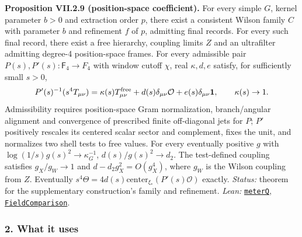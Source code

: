 \documentclass[
  letterpaper,
  11pt]{article}
\begin{document}
\textbf{Proposition VII.2.9 (position-space coefficient).} For every
simple \(G\), kernel parameter \(b>0\) and extraction order \(p\), there
exist a consistent Wilson family \(C\) with parameter \(b\) and
refinement \(f\) of \(p\), admitting final records. For every such final
record, there exist a free hierarchy, coupling limits \(Z\) and an
ultrafilter admitting degree-4 position-space frames. For every
admissible pair \(P(s),P'(s):\mathsf F_4\to F_4\) with window cutoff
\(\chi\), real \(\kappa,d,e\) satisfy, for sufficiently small \(s>0\),
\[P'(s)^{-1}(s^4T_{\mu\nu})=\kappa(s)T^{\rm free}_{\mu\nu}+d(s)\delta_{\mu\nu}\mathcal O+e(s)\delta_{\mu\nu}\mathbf1,\qquad\kappa(s)\to1.\]
Admissibility requires position-space Gram normalization, branch/angular
alignment and convergence of prescribed finite off-diagonal jets for
\(P\); \(P'\) positively rescales its centered scalar sector and
complement, fixes the unit, and normalizes two shell tests to free
values. For every eventually positive \(g\) with
\(\log(1/s)g(s)^2\to\kappa_G^{-1}\), \(d(s)/g(s)^2\to d_2\). The
test-defined coupling satisfies \(g_X/g_W\to1\) and
\(d-d_2g_X^2=O(g_X^4)\), where \(g_W\) is the Wilson coupling from
\(Z\). Eventually
\(s^4\Theta=4d(s)\mathrm{center}_{\xi_*}(P'(s)\mathcal O)\) exactly.
\emph{Status:} theorem for the supplementary construction's family and
refinement. \emph{Lean:}
\href{https://github.com/yang-mills-group/OpenAI-YM-20261028/blob/3456e5e75cf8d4cd558955a5c7638fba2d68f464/YM/TraceExtension/Sundial/Noon.lean\#L50-L83}{\texttt{meterQ}},
\href{https://github.com/yang-mills-group/OpenAI-YM-20261028/blob/3456e5e75cf8d4cd558955a5c7638fba2d68f464/YM/TraceExtension/Endpoint.lean\#L37-L64}{\texttt{FieldComparison}}.

\subsubsection{2. What it uses}\label{what-it-uses-26}
\end{document}
